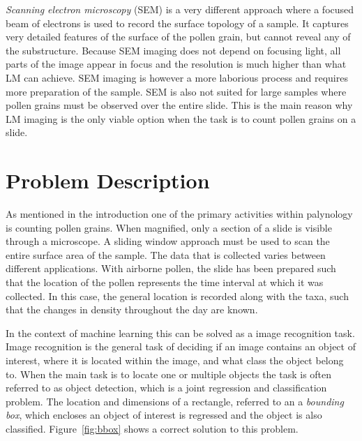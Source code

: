 \textit{Scanning electron microscopy} (SEM) is a very different approach where a focused beam of electrons is used to record the surface topology of a sample.
It captures very detailed features of the surface of the pollen grain, but cannot reveal any of the substructure.
Because SEM imaging does not depend on focusing light, all parts of the image appear in focus and the resolution is much higher than what LM can achieve.
SEM imaging is however a more laborious process and requires more preparation of the sample.
SEM is also not suited for large samples where pollen grains must be observed over the entire slide.
This is the main reason why LM imaging is the only viable option when the task is to count pollen grains on a slide.

\section{Problem Description}



As mentioned in the introduction one of the primary activities within palynology is counting pollen grains.
When magnified, only a section of a slide is visible through a microscope.
A sliding window approach must be used to scan the entire surface area of the sample.
The data that is collected varies between different applications.
With airborne pollen, the slide has been prepared such that the location of the pollen represents the time interval at which it was collected.
In this case, the general location is recorded along with the taxa, such that the changes in density throughout the day are known.

In the context of machine learning this can be solved as a image recognition task.
Image recognition is the general task of deciding if an image contains an object of interest, where it is located within the image, and what class the object belong to.
When the main task is to locate one or multiple objects the task is often referred to as object detection, which is a joint regression and classification problem.
The location and dimensions of a rectangle, referred to an a \textit{bounding box}, which encloses an object of interest is regressed and the object is also classified.
Figure~\ref{fig:bbox} shows a correct solution to this problem.

